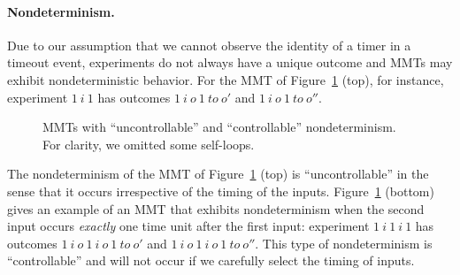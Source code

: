 \paragraph{Nondeterminism.}
Due to our assumption that we cannot observe the identity of a timer in a timeout event, 
experiments do not always have a unique outcome and MMTs may exhibit nondeterministic behavior.
For the MMT of Figure~\ref{fig:nondeterminism} (top), for instance, experiment $1 ~ i ~ 1$ has outcomes
$1 ~ i ~ o ~ 1 ~ \mathit{to} ~ o'$ and $1 ~ i ~ o ~ 1 ~ \mathit{to} ~ o''$.
\begin{figure}[ht]
\vspace{-1em}
\begin{center}
\caption{MMTs with ``uncontrollable'' and ``controllable'' nondeterminism. For clarity, we omitted some self-loops.}
\label{fig:nondeterminism}
\end{center}
\end{figure}

The nondeterminism of the MMT of Figure~\ref{fig:nondeterminism} (top)
is ``uncontrollable'' in the sense that it occurs irrespective of the timing of the inputs.
Figure~\ref{fig:nondeterminism} (bottom) gives an example of an MMT that exhibits nondeterminism when the second input occurs \emph{exactly} one time unit after the first input: experiment $1 ~ i ~ 1 ~ i ~ 1$ has outcomes
$1 ~ i ~ o ~ 1 ~ i ~ o ~ 1 ~ \mathit{to} ~ o'$ and $1 ~ i ~ o ~ 1 ~ i ~ o ~ 1 ~ \mathit{to} ~ o''$.
This type of nondeterminism is ``controllable'' and will not occur if we carefully
select the timing of inputs.

